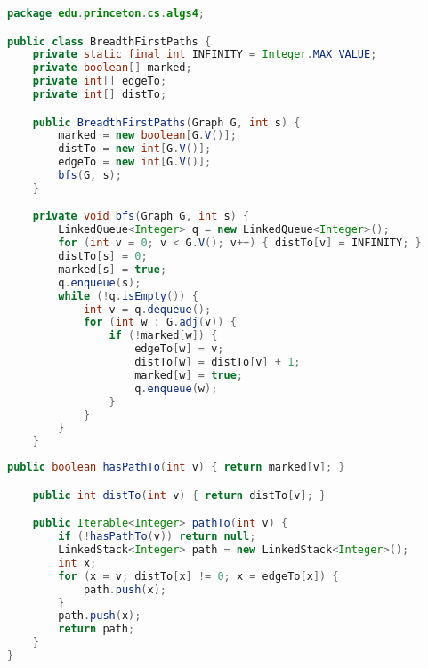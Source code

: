 \documentclass[8pt,a4paper,compress]{beamer}
\begin{document}
\begin{frame}[fragile]
\pause

\begin{lstlisting}[language=Java]
package edu.princeton.cs.algs4;

public class BreadthFirstPaths {
    private static final int INFINITY = Integer.MAX_VALUE;
    private boolean[] marked; 
    private int[] edgeTo; 
    private int[] distTo;   

    public BreadthFirstPaths(Graph G, int s) {
        marked = new boolean[G.V()];
        distTo = new int[G.V()];
        edgeTo = new int[G.V()];
        bfs(G, s);
    }

    private void bfs(Graph G, int s) {
        LinkedQueue<Integer> q = new LinkedQueue<Integer>();
        for (int v = 0; v < G.V(); v++) { distTo[v] = INFINITY; }
        distTo[s] = 0;
        marked[s] = true;
        q.enqueue(s);
        while (!q.isEmpty()) {
            int v = q.dequeue();
            for (int w : G.adj(v)) {
                if (!marked[w]) {
                    edgeTo[w] = v;
                    distTo[w] = distTo[v] + 1;
                    marked[w] = true;
                    q.enqueue(w);
                }
            }
        }
    }
\end{lstlisting}
\end{frame}

\begin{frame}[fragile]
\pause

\begin{lstlisting}[language=Java]
    public boolean hasPathTo(int v) { return marked[v]; }

    public int distTo(int v) { return distTo[v]; }

    public Iterable<Integer> pathTo(int v) {
        if (!hasPathTo(v)) return null;
        LinkedStack<Integer> path = new LinkedStack<Integer>();
        int x;
        for (x = v; distTo[x] != 0; x = edgeTo[x]) {
            path.push(x);
        }
        path.push(x);
        return path;
    }
}
\end{lstlisting}
\end{frame}

\begin{frame}[fragile]
\pause

Trace
\begin{center}
}
\end{center}
\end{frame}
\end{document}

